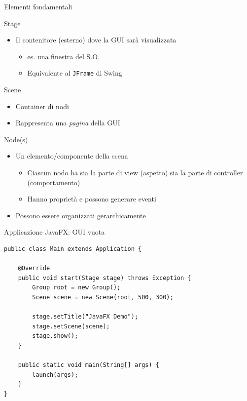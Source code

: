 \documentclass[presentation]{beamer}
\begin{document}
\begin{frame}{Elementi fondamentali}
\begin{block}{Stage}
\begin{itemize}
\item Il contenitore (esterno) dove la GUI sarà visualizzata
\begin{itemize}
\item es. una finestra del S.O.
\item Equivalente al \texttt{JFrame} di Swing
\end{itemize}
\end{itemize}

\end{block}

\begin{block}{Scene}
\begin{itemize}
\item Container di nodi
\item Rappresenta una \emph{pagina} della GUI
\end{itemize}
\end{block}

\begin{block}{Node(s)}
\begin{itemize}
\item Un elemento/componente della scena
\begin{itemize}
\item Ciascun nodo ha sia la parte di view (aspetto) sia la parte di controller (comportamento)
\item Hanno proprietà e possono generare eventi
\end{itemize}
\item Possono essere organizzati gerarchicamente
\end{itemize}
\end{block}
\end{frame}

\begin{frame}[fragile]{Applicazione JavaFX: GUI vuota}
\begin{lstlisting}
public class Main extends Application {

	@Override
	public void start(Stage stage) throws Exception {
		Group root = new Group();
		Scene scene = new Scene(root, 500, 300);
		
		stage.setTitle("JavaFX Demo");
		stage.setScene(scene);
		stage.show();
	}
	
	public static void main(String[] args) {
		launch(args);
	}
}
\end{lstlisting}
\end{frame}
\end{document}
